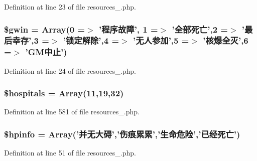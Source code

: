 Definition at line 23 of file resources\+\_.\+php.

\hypertarget{resources__1_8php_a2957a034129d3598a5d35640b8906532}{
\subsubsection[{\$gwin}]{\setlength{\rightskip}{0pt plus 5cm}\$gwin = Array(0 =$>$ '程序故障', 1 =$>$ '全部死亡',2 =$>$ '最后幸存',3 =$>$ '锁定解除',4 =$>$ '无人参加',5 =$>$ '核爆全灭',6 =$>$ 'G\+M中止')}}\label{resources__1_8php_a2957a034129d3598a5d35640b8906532}


Definition at line 24 of file resources\+\_.\+php.

\hypertarget{resources__1_8php_a522f774b7af7274c8142c2bf00854709}{
\subsubsection[{\$hospitals}]{\setlength{\rightskip}{0pt plus 5cm}\$hospitals = Array(11,19,32)}}\label{resources__1_8php_a522f774b7af7274c8142c2bf00854709}


Definition at line 581 of file resources\+\_.\+php.

\hypertarget{resources__1_8php_a6f91f38ee66d31d99255d9dc86032980}{
\subsubsection[{\$hpinfo}]{\setlength{\rightskip}{0pt plus 5cm}\$hpinfo = Array('并无大碍','伤痕累累','生命危险','已经死亡')}}\label{resources__1_8php_a6f91f38ee66d31d99255d9dc86032980}


Definition at line 51 of file resources\+\_.\+php.

